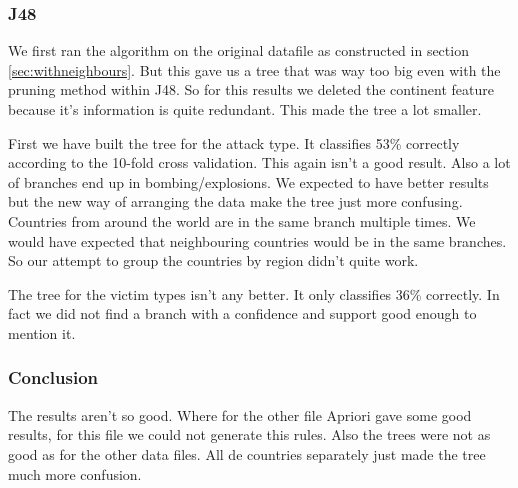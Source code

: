 \documentclass[a4]{article}
\begin{document}
\subsubsection{J48}
We first ran the algorithm on the original datafile as constructed in section \ref{sec:withneighbours}. But this gave us a tree that was way too big even with the pruning method within J48. So for this results we deleted the continent feature because it's information is quite redundant. This made the tree a lot smaller.\par
First we have built the tree for the attack type. It classifies 53\% correctly according to the 10-fold cross validation. This again isn't a good result. Also a lot of branches end up in bombing/explosions. We expected to have better results but the new way of arranging the data make the tree just more confusing. Countries from around the world are in the same branch multiple times. We would have expected that neighbouring countries would be in the same branches. So our attempt to group the countries by region didn't quite work.\par
The tree for the victim types isn't any better. It only classifies 36\% correctly. 
In fact we did not find a branch with a confidence and support good enough to mention it.
\subsubsection{Conclusion}
The results aren't so good. Where for the other file Apriori gave some good results, for this file we could not generate this rules. Also the trees were not as good as for the other data files. All de countries separately just made the tree much more confusion.
\end{document}
